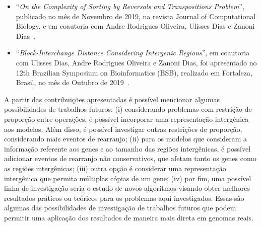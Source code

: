 \begin{itemize}
  \item ``\textit{On the Complexity of Sorting by Reversals and Transpositions Problem}'', publicado no mês de Novembro de 2019, na revista Journal of Computational Biology, e em coautoria com Andre Rodrigues Oliveira, Ulisses Dias e Zanoni Dias~\cite{2019b-oliveira-etal}.

  \item ``\textit{Block-Interchange Distance Considering Intergenic Regions}'', em coautoria com Ulisses Dias, Andre Rodrigues Oliveira e Zanoni Dias, foi apresentado no 12th Brazilian Symposium on Bioinformatics (BSB), realizado em Fortaleza, Brasil, no mês de Outubro de 2019~\cite{2019-dias-etal}.
\end{itemize}

A partir das contribuições apresentadas é possível mencionar algumas possibilidades de trabalhos futuros: (i) considerando problemas com restrição de proporção entre operações, é possível incorporar uma representação intergênica aos modelos. Além disso, é possível investigar outras restrições de proporção, considerando mais eventos de rearranjo; (ii) para os modelos que consideram a informação referente aos genes e ao tamanho das regiões intergênicas, é possível adicionar eventos de rearranjo não conservativos, que afetam tanto os genes como as regiões intergênicas; (iii) outra opção é considerar uma representação intergênica que permita múltiplas cópias de um gene; (iv) por fim, uma possível linha de investigação seria o estudo de novos algoritmos visando obter melhores resultados práticos ou teóricos para os problemas aqui investigados.  Essas são algumas das possibilidades de investigação de trabalhos futuros que podem permitir uma aplicação dos resultados de maneira mais direta em genomas reais. 